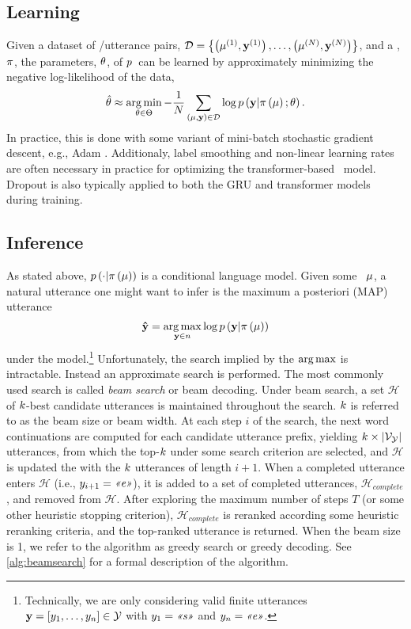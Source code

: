 \subsection{Learning}

Given a dataset of \meaningrepresentation/utterance pairs, $\mathcal{D} =
\left\{\left(\mu^{(1)}, \mathbf{y}^{(1)}\right), \ldots,
\left(\mu^{(N)},\mathbf{y}^{(N)} \right)\right\}$, and a
\linearizationstrategy, $\pi$, the parameters, $\theta$, of $p$~can be
learned by approximately minimizing the negative log-likelihood of the data,
\[ \hat{\theta} \approx \operatorname*{arg\,min}_{\theta \in \Theta} -\frac{1}{N}\sum_{\left(\mu, \mathbf{y} \right) \in \mathcal{D}} 
    \log p\left(\mathbf{y}|\pi\left(\mu\right);\theta\right).
\]
In practice, this is done with some variant of mini-batch stochastic gradient
descent, e.g., Adam \citep{kingma2014adam}.  Additionaly, label smoothing
\citep{szegedy2016} and non-linear learning rates are often necessary in
practice for optimizing the transformer-based \sequencetosequence~model.
Dropout is also typically applied to both the GRU and transformer models during
training. 



\subsection{Inference}
\label{sec:nlginference}

As stated above, $p\left(\cdot|\pi\left(\mu\right)\right)$ is a conditional
language model.  Given some \meaningrepresentation~$\mu$, a natural utterance
one might want to infer is the maximum a posteriori (MAP) utterance 
\[
 \boldsymbol{\hat{\mathbf{y}}} = \operatorname*{arg\,max}_{\mathbf{y}\in n} \log p\left(\mathbf{y}|\pi\left(\mu\right)\right) 
\] 
under the model.\footnote{Technically, we are only considering valid finite
utterances $\mathbf{y} = \left[y_1,\ldots,y_n\right] \in
\mathcal{Y}$ with $y_1 = \textit{<<s>>}$ and $y_n = \textit{<<e>>}$. }
Unfortunately, the search implied by the $\operatorname*{arg\,max}$ is intractable. Instead an
approximate search is performed. The most commonly used search is called
\textit{beam search} \citep{reddy1977} or beam decoding.  Under beam search, a
set $\mathcal{H}$ of $k$-best candidate utterances is maintained
throughout the search. $k$ is referred to as the beam size or beam width.
At each step $i$ of the search, the next word continuations are computed for
each candidate utterance prefix, yielding $k \times \lvert\mathcal{V}_{\mathcal{Y}}\rvert$
utterances, from which the top-$k$ under some search criterion are
selected, and $\mathcal{H}$ is updated the with the $k$ utterances of
length $i+1$.  When a completed utterance enters $\mathcal{H}$ (i.e.,
$y_{i+1} = \textit{<<e>>}$), it is added to a set of completed utterances,
$\mathcal{H}_{complete}$, and removed from $\mathcal{H}$.  After exploring the
maximum number of steps $T$ (or some other heuristic stopping criterion),
$\mathcal{H}_{complete}$ is reranked according some heuristic reranking
criteria, and the top-ranked  utterance is returned.  When the beam size is 1,
we refer to the algorithm as greedy search or greedy decoding.  See
\autoref{alg:beamsearch} for a formal description of the algorithm.

